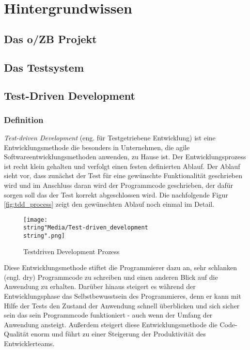 \documentclass[12pt,             %
               a4paper,          %
               listof=totoc,     %
               index=totoc,      %
               bibliography=totoc,%
               oneside,         %
               BCOR1cm,          %
               english   %
               ]{scrbook}
\begin{document}
\clearpage
\chapter{Hintergrundwissen}
\section{Das o/ZB Projekt}

\section{Das Testsystem}\label{sec:Das_Testsystem}

\section{Test-Driven Development}
\subsection{Definition}
\textit{Test-driven Development} (eng. für \glqq Testgetriebene Entwicklung\grqq) ist eine Entwicklungsmethode die besonders in Unternehmen, die agile Softwareentwicklungsmethoden anwenden, zu Hause ist. Der Entwicklungsprozess ist recht klein gehalten und verfolgt einen festen definierten Ablauf. Der Ablauf sieht vor, dass zunächst der Test für eine gewünschte Funktionalität geschrieben wird und im Anschluss daran wird der Programmcode geschrieben, der dafür sorgen soll das der Test korrekt abgeschlossen wird. Die nachfolgende Figur \vref{fig:tdd_process} zeigt den gewünschten Ablauf noch einmal im Detail.

\begin{figure}[H]
     \begin{center}
          \texttt{[image: \\string"Media/Test-driven\_development\\string".png]}
     \end{center}
     \label{fig:tdd_process}
     \caption{Testdriven Development Prozess}
\end{figure} 

Diese Entwicklungsmethode stiftet die Programmierer dazu an, sehr schlanken (engl. \glqq dry\grqq) Programmcode zu schreiben und einen anderen Blick auf die Anwendung zu erhalten. Darüber hinaus steigert es während der Entwicklungsphase das Selbstbewusstsein des Programmieres, denn er kann mit Hilfe der Tests den Zustand der Anwendung schnell überblicken und sich sicher sein das sein Programmcode funktioniert - auch wenn der Umfang der Anwendung ansteigt. Außerdem steigert diese Entwicklungsmethode die Code-Qualität enorm und führt zu einer Steigerung der Produktivität des Entwicklerteams.\\
\end{document}
